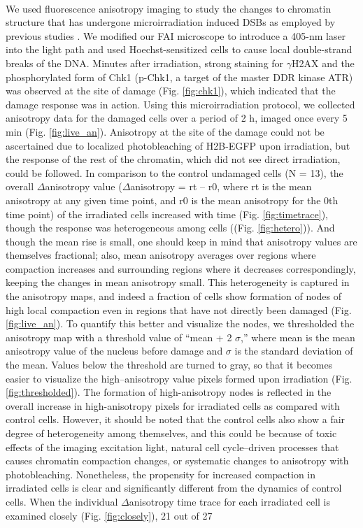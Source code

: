 \paragraph*{} We used fluorescence anisotropy imaging to study the changes to chromatin structure that has undergone microirradiation induced DSBs as employed by previous studies \cite{kruhlak2006changes, BURGESS20141703,strickfaden2016poly}. We modified our FAI microscope to introduce a 405-nm laser into the light path and used Hoechst-sensitized cells to cause local double-strand breaks of the DNA. Minutes after irradiation, strong staining for $\gamma$H2AX and the phosphorylated form of Chk1 (p-Chk1, a target of the master DDR kinase ATR) was observed at the site of damage (Fig. {\ref{fig:chk1}}), which indicated that the damage response was in action. Using this microirradiation protocol, we collected anisotropy data for the damaged cells over a period of 2 h, imaged once every 5 min (Fig. {\ref{fig:live_an}}). Anisotropy at the site of the damage could not be ascertained due to localized photobleaching of H2B-EGFP upon irradiation, but the response of the rest of the chromatin, which did not see direct irradiation, could be followed. In comparison to the control undamaged cells (N = 13), the overall $\Delta$anisotropy value ($\Delta$anisotropy = rt – r0, where rt is the mean anisotropy at any given time point, and r0 is the mean anisotropy for the 0th time point) of the irradiated cells increased with time (Fig. {\ref{fig:timetrace}}), though the response was heterogeneous among cells ((Fig. {\ref{fig:hetero}})). And though the mean rise is small, one should keep in mind that anisotropy values are themselves fractional; also, mean anisotropy averages over regions where compaction increases and surrounding regions where it decreases correspondingly, keeping the changes in mean anisotropy small. This heterogeneity is captured in the anisotropy maps, and indeed a fraction of cells show formation of nodes of high local compaction even in regions that have not directly been damaged (Fig. {\ref{fig:live_an}}). To quantify this better and visualize the nodes, we thresholded the anisotropy map with a threshold value of “mean + 2 $\sigma$,” where mean is the mean anisotropy value of the nucleus before damage and $\sigma$ is the standard deviation of the mean. Values below the threshold are turned to gray, so that it becomes easier to visualize the high–anisotropy value pixels formed upon irradiation (Fig. {\ref{fig:thresholded}}). The formation of high-anisotropy nodes is reflected in the overall increase in high-anisotropy pixels for irradiated cells as compared with control cells. However, it should be noted that the control cells also show a fair degree of heterogeneity among themselves, and this could be because of toxic effects of the imaging excitation light, natural cell cycle–driven processes that causes chromatin compaction changes, or systematic changes to anisotropy with photobleaching. Nonetheless, the propensity for increased compaction in irradiated cells is clear and significantly different from the dynamics of control cells. When the individual $\Delta$anisotropy time trace for each irradiated cell is examined closely (Fig. {\ref{fig:closely}}), 21 out of 27 